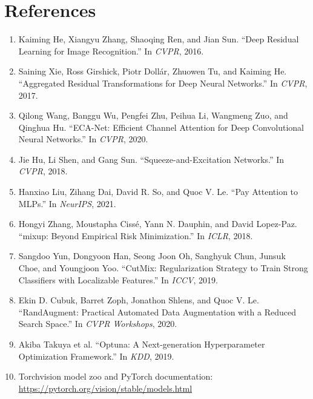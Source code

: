 \documentclass[11pt]{article}
\begin{document}
\section{References}
\begin{enumerate}[leftmargin=1.5em]
\item Kaiming He, Xiangyu Zhang, Shaoqing Ren, and Jian Sun. ``Deep Residual Learning for Image Recognition.'' In \emph{CVPR}, 2016.
\item Saining Xie, Ross Girshick, Piotr Doll\'ar, Zhuowen Tu, and Kaiming He. ``Aggregated Residual Transformations for Deep Neural Networks.'' In \emph{CVPR}, 2017.
\item Qilong Wang, Banggu Wu, Pengfei Zhu, Peihua Li, Wangmeng Zuo, and Qinghua Hu. ``ECA-Net: Efficient Channel Attention for Deep Convolutional Neural Networks.'' In \emph{CVPR}, 2020.
\item Jie Hu, Li Shen, and Gang Sun. ``Squeeze-and-Excitation Networks.'' In \emph{CVPR}, 2018.
\item Hanxiao Liu, Zihang Dai, David R. So, and Quoc V. Le. ``Pay Attention to MLPs.'' In \emph{NeurIPS}, 2021.
\item Hongyi Zhang, Moustapha Ciss\'e, Yann N. Dauphin, and David Lopez-Paz. ``mixup: Beyond Empirical Risk Minimization.'' In \emph{ICLR}, 2018.
\item Sangdoo Yun, Dongyoon Han, Seong Joon Oh, Sanghyuk Chun, Junsuk Choe, and Youngjoon Yoo. ``CutMix: Regularization Strategy to Train Strong Classifiers with Localizable Features.'' In \emph{ICCV}, 2019.
\item Ekin D. Cubuk, Barret Zoph, Jonathon Shlens, and Quoc V. Le. ``RandAugment: Practical Automated Data Augmentation with a Reduced Search Space.'' In \emph{CVPR Workshops}, 2020.
\item Akiba Takuya et al. ``Optuna: A Next-generation Hyperparameter Optimization Framework.'' In \emph{KDD}, 2019.
\item Torchvision model zoo and PyTorch documentation: \url{https://pytorch.org/vision/stable/models.html}
\end{enumerate}
 
\end{document}
